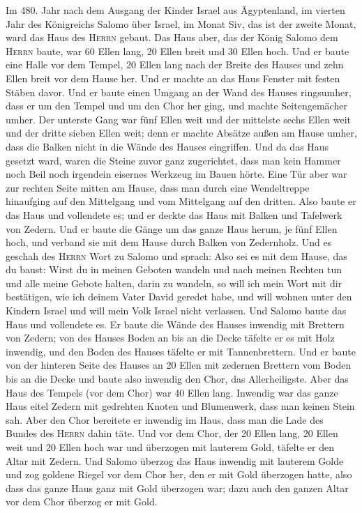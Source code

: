  Im 480. Jahr nach dem Ausgang der Kinder Israel aus
Ägyptenland, im vierten Jahr des Königreichs Salomo über Israel, im
Monat Siv, das ist der zweite Monat, ward das Haus des \textsc{Herrn}
gebaut.  Das Haus aber, das der König Salomo dem
\textsc{Herrn} baute, war 60 Ellen lang, 20 Ellen breit und 30 Ellen
hoch.  Und er baute eine Halle vor dem Tempel, 20 Ellen
lang nach der Breite des Hauses und zehn Ellen breit vor dem Hause her.
 Und er machte an das Haus Fenster mit festen Stäben
davor.  Und er baute einen Umgang an der Wand des Hauses
ringsumher, dass er um den Tempel und um den Chor her ging, und machte
Seitengemächer umher.  Der unterste Gang war fünf Ellen
weit und der mittelste sechs Ellen weit und der dritte sieben Ellen
weit; denn er machte Absätze außen am Hause umher, dass die Balken nicht
in die Wände des Hauses eingriffen.  Und da das Haus
gesetzt ward, waren die Steine zuvor ganz zugerichtet, dass man kein
Hammer noch Beil noch irgendein eisernes Werkzeug im Bauen hörte.
 Eine Tür aber war zur rechten Seite mitten am Hause, dass
man durch eine Wendeltreppe hinaufging auf den Mittelgang und vom
Mittelgang auf den dritten.  Also baute er das Haus und
vollendete es; und er deckte das Haus mit Balken und Tafelwerk von
Zedern.  Und er baute die Gänge um das ganze Haus herum,
je fünf Ellen hoch, und verband sie mit dem Hause durch Balken von
Zedernholz.  Und es geschah des \textsc{Herrn} Wort zu
Salomo und sprach:  Also sei es mit dem Hause, das du
baust: Wirst du in meinen Geboten wandeln und nach meinen Rechten tun
und alle meine Gebote halten, darin zu wandeln, so will ich mein Wort
mit dir bestätigen, wie ich deinem Vater David geredet habe,
 und will wohnen unter den Kindern Israel und will mein
Volk Israel nicht verlassen.  Und Salomo baute das Haus
und vollendete es.  Er baute die Wände des Hauses
inwendig mit Brettern von Zedern; von des Hauses Boden an bis an die
Decke täfelte er es mit Holz inwendig, und den Boden des Hauses täfelte
er mit Tannenbrettern.  Und er baute von der hinteren
Seite des Hauses an 20 Ellen mit zedernen Brettern vom Boden bis an die
Decke und baute also inwendig den Chor, das Allerheiligste.
 Aber das Haus des Tempels (vor dem Chor) war 40 Ellen
lang.  Inwendig war das ganze Haus eitel Zedern mit
gedrehten Knoten und Blumenwerk, dass man keinen Stein sah.
 Aber den Chor bereitete er inwendig im Haus, dass man
die Lade des Bundes des \textsc{Herrn} dahin täte.  Und
vor dem Chor, der 20 Ellen lang, 20 Ellen weit und 20 Ellen hoch war und
überzogen mit lauterem Gold, täfelte er den Altar mit Zedern.
 Und Salomo überzog das Haus inwendig mit lauterem Golde
und zog goldene Riegel vor dem Chor her, den er mit Gold überzogen
hatte,  also dass das ganze Haus ganz mit Gold überzogen
war; dazu auch den ganzen Altar vor dem Chor überzog er mit Gold.

